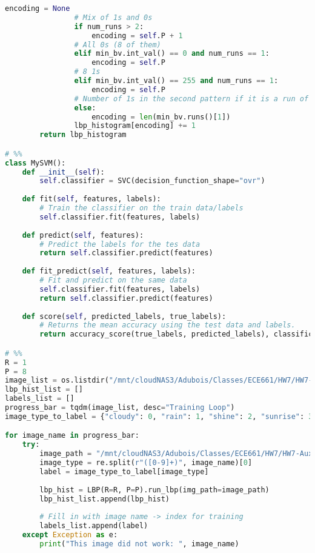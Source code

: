 \documentclass{article}
\begin{document}
\begin{lstlisting}[language=Python]
                encoding = None
                # Mix of 1s and 0s
                if num_runs > 2:
                    encoding = self.P + 1
                # All 0s (8 of them)
                elif min_bv.int_val() == 0 and num_runs == 1:
                    encoding = self.P
                # 8 1s
                elif min_bv.int_val() == 255 and num_runs == 1:
                    encoding = self.P
                # Number of 1s in the second pattern if it is a run of all 0s then 1s
                else:
                    encoding = len(min_bv.runs()[1])
                lbp_histogram[encoding] += 1
        return lbp_histogram

# %%
class MySVM():
    def __init__(self):
        self.classifier = SVC(decision_function_shape="ovr")
        
    def fit(self, features, labels):
        # Train the classifier on the train data/labels
        self.classifier.fit(features, labels)
        
    def predict(self, features):
        # Predict the labels for the tes data
        return self.classifier.predict(features)
        
    def fit_predict(self, features, labels):
        # Fit and predict on the same data
        self.classifier.fit(features, labels)
        return self.classifier.predict(features)
        
    def score(self, predicted_labels, true_labels):
        # Returns the mean accuracy using the test data and labels.
        return accuracy_score(true_labels, predicted_labels), classification_report(true_labels, predicted_labels)

# %%
R = 1
P = 8
image_list = os.listdir("/mnt/cloudNAS3/Adubois/Classes/ECE661/HW7/HW7-Auxilliary/data/training/")
lbp_hist_list = []
labels_list = []
progress_bar = tqdm(image_list, desc="Training Loop")
image_type_to_label = {"cloudy": 0, "rain": 1, "shine": 2, "sunrise": 3}

for image_name in progress_bar:
    try:
        image_path = "/mnt/cloudNAS3/Adubois/Classes/ECE661/HW7/HW7-Auxilliary/data/training/" + image_name
        image_type = re.split(r"([0-9]+)", image_name)[0]
        label = image_type_to_label[image_type]
        
        lbp_hist = LBP(R=R, P=P).run_lbp(img_path=image_path)
        lbp_hist_list.append(lbp_hist)
        
        # Fill in with image name -> index for training
        labels_list.append(label)
    except Exception as e:
        print("This image did not work: ", image_name)
    


\end{lstlisting}
\end{document}
